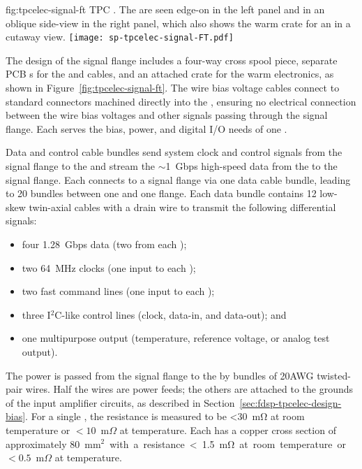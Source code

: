\begin{dunefigure}
{fig:tpcelec-signal-ft}
{TPC  \fdth. The  are seen edge-on in the left panel and in an oblique side-view in the right panel, which also shows the warm crate for an  %
in a cutaway view.}
\texttt{[image: sp-tpcelec-signal-FT.pdf]}
\end{dunefigure}

The design of the signal flange includes a four-way cross spool piece, separate PCB \fdth{}s for the  and  cables, and
an attached crate for the  warm electronics, as shown in Figure~\ref{fig:tpcelec-signal-ft}.
The wire bias voltage cables connect to standard  connectors machined directly into the  \fdth,
ensuring no electrical connection between the wire bias voltages and other signals passing through the signal flange.
Each  \fdth serves the bias, power, and digital I/O needs of one .  

Data and control cable bundles send system clock and control signals from the 
signal flange to the  and stream the $\sim$\SI{1}{Gbps} high-speed data from the  to the signal flange.  Each  
connects to a signal flange via one data cable bundle, leading to 20 bundles between one  and one flange.  Each data bundle contains 12 low-skew twin-axial cables with a drain wire 
to transmit the following differential signals:
\begin{itemize}
    \item four \SI{1.28}{Gbps} data (two from each );
    \item two \SI{64}{MHz} clocks (one input to each );
    \item two fast command lines (one input to each );
    \item three I$^2$C-like control lines (clock, data-in, and data-out); and
    \item one multipurpose  output (temperature, reference voltage, or analog test output).
\end{itemize}

The  power is passed from the signal flange to the  by bundles of
20AWG twisted-pair wires. Half the wires are power feeds; the others
are attached to the grounds of the input amplifier circuits, as described in Section~\ref{sec:fdsp-tpcelec-design-bias}.
For a single , the resistance is measured to be  <\SI{30}{\milli\ohm} at room temperature or $<10$~m$\Omega$ at 
 temperature. Each  has a copper cross section of approximately %
\SI{80}{mm$^2$} with a 
resistance <\SI{1.5}{\milli\ohm} at room temperature or $<0.5$~m$\Omega$ at  temperature.

